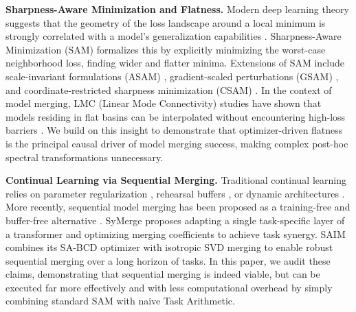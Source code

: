 \textbf{Sharpness-Aware Minimization and Flatness.} Modern deep learning theory suggests that the geometry of the loss landscape around a local minimum is strongly correlated with a model's generalization capabilities \cite{weight_averaging, sam}. Sharpness-Aware Minimization (SAM) \cite{sam} formalizes this by explicitly minimizing the worst-case neighborhood loss, finding wider and flatter minima. Extensions of SAM include scale-invariant formulations (ASAM) \cite{asampaper}, gradient-scaled perturbations (GSAM) \cite{gsampaper}, and coordinate-restricted sharpness minimization (CSAM) \cite{csampaper}. In the context of model merging, LMC (Linear Mode Connectivity) studies have shown that models residing in flat basins can be interpolated without encountering high-loss barriers \cite{lmc1, lmc2}. We build on this insight to demonstrate that optimizer-driven flatness is the principal causal driver of model merging success, making complex post-hoc spectral transformations unnecessary.

\textbf{Continual Learning via Sequential Merging.} Traditional continual learning relies on parameter regularization \cite{ewc, mas, si}, rehearsal buffers \cite{gem, der}, or dynamic architectures \cite{gpm, hat}. More recently, sequential model merging has been proposed as a training-free and buffer-free alternative \cite{clmerging}. SyMerge \cite{symerge2026} proposes adapting a single task-specific layer of a transformer and optimizing merging coefficients to achieve task synergy. SAIM \cite{saim2026} combines its SA-BCD optimizer with isotropic SVD merging to enable robust sequential merging over a long horizon of tasks. In this paper, we audit these claims, demonstrating that sequential merging is indeed viable, but can be executed far more effectively and with less computational overhead by simply combining standard SAM with naive Task Arithmetic.
